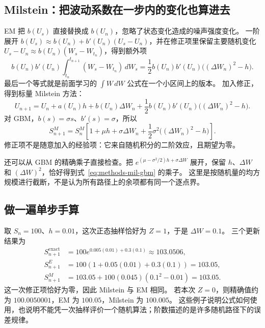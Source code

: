 \subsection{Milstein：把波动系数在一步内的变化也算进去}
EM 把 $b(U_s)$ 直接替换成 $b(U_n)$，忽略了状态变化造成的噪声强度变化。
一阶展开 $b(U_s)\approx b(U_n)+b'(U_n)(U_s-U_n)$，并在修正项里保留主要随机变化
$U_s-U_n\approx b(U_n)(W_s-W_{t_n})$，得到额外项
\begin{equation}\label{eq:methods-mil-integral}
 b(U_n)b'(U_n)\int_{t_n}^{t_{n+1}}(W_s-W_{t_n})\,dW_s
 =\frac12 b(U_n)b'(U_n)\bigl((\Delta W_n)^2-h\bigr).
\end{equation}
最后一个等式就是前面学习的 $\int W\,dW$ 公式在一个小区间上的版本。
加入修正，得到标量 Milstein 方法：
\begin{equation}\label{eq:methods-mil-general}
 U_{n+1}=U_n+a(U_n)h+b(U_n)\Delta W_n
 +\frac12b(U_n)b'(U_n)\bigl((\Delta W_n)^2-h\bigr).
\end{equation}
对 GBM，$b(s)=\sigma s$、$b'(s)=\sigma$，所以
\begin{equation}\label{eq:methods-mil-gbm}
 S_{n+1}^{M}=S_n^{M}\left[1+\mu h+\sigma\Delta W_n+
 \frac12\sigma^2\bigl((\Delta W_n)^2-h\bigr)\right].
\end{equation}
修正项不是随意加入的经验项：它来自随机积分的二阶效应，且期望为零。

还可以从 GBM 的精确乘子直接检查。把 $e^{(\mu-\sigma^2/2)h+\sigma\Delta W}$ 展开，保留 $h$、$\Delta W$ 和 $(\Delta W)^2$，恰好得到式~\eqref{eq:methods-mil-gbm} 的乘子。
这里是按随机量的均方规模进行截断，不是认为所有路径上的余项都有同一个逐点界。

\subsection{做一遍单步手算}
取 $S_n=100$、$h=0.01$，这次正态抽样恰好为 $Z=1$，于是 $\Delta W=0.1$。
三个更新结果为
\begin{align}
 S_{n+1}^{\mathrm{exact}}&=100e^{0.005(0.01)+0.3(0.1)}
 \approx103.0506,\label{eq:methods-example-exact}\\
 S_{n+1}^{E}&=100(1+0.05(0.01)+0.3(0.1))=103.05,\label{eq:methods-example-em}\\
 S_{n+1}^{M}&=103.05+100(0.045)(0.1^2-0.01)=103.05.\label{eq:methods-example-mil}
\end{align}
这一次修正项恰好为零，因此 Milstein 与 EM 相同。
若本次 $Z=0$，则精确值约为 $100.0050001$，EM 为 $100.05$，Milstein 为 $100.005$。
这些例子说明公式如何使用，也说明不能凭一次抽样评价一个随机算法；阶数描述的是许多随机路径下的误差规律。

